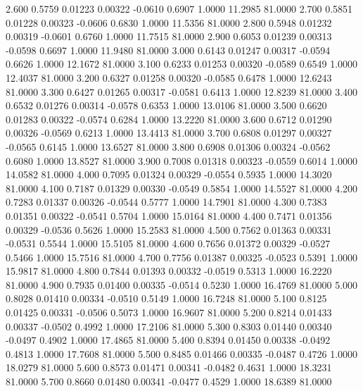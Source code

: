    2.600   0.5759   0.01223   0.00322  -0.0610   0.6907   1.0000  11.2985  81.0000
   2.700   0.5851   0.01228   0.00323  -0.0606   0.6830   1.0000  11.5356  81.0000
   2.800   0.5948   0.01232   0.00319  -0.0601   0.6760   1.0000  11.7515  81.0000
   2.900   0.6053   0.01239   0.00313  -0.0598   0.6697   1.0000  11.9480  81.0000
   3.000   0.6143   0.01247   0.00317  -0.0594   0.6626   1.0000  12.1672  81.0000
   3.100   0.6233   0.01253   0.00320  -0.0589   0.6549   1.0000  12.4037  81.0000
   3.200   0.6327   0.01258   0.00320  -0.0585   0.6478   1.0000  12.6243  81.0000
   3.300   0.6427   0.01265   0.00317  -0.0581   0.6413   1.0000  12.8239  81.0000
   3.400   0.6532   0.01276   0.00314  -0.0578   0.6353   1.0000  13.0106  81.0000
   3.500   0.6620   0.01283   0.00322  -0.0574   0.6284   1.0000  13.2220  81.0000
   3.600   0.6712   0.01290   0.00326  -0.0569   0.6213   1.0000  13.4413  81.0000
   3.700   0.6808   0.01297   0.00327  -0.0565   0.6145   1.0000  13.6527  81.0000
   3.800   0.6908   0.01306   0.00324  -0.0562   0.6080   1.0000  13.8527  81.0000
   3.900   0.7008   0.01318   0.00323  -0.0559   0.6014   1.0000  14.0582  81.0000
   4.000   0.7095   0.01324   0.00329  -0.0554   0.5935   1.0000  14.3020  81.0000
   4.100   0.7187   0.01329   0.00330  -0.0549   0.5854   1.0000  14.5527  81.0000
   4.200   0.7283   0.01337   0.00326  -0.0544   0.5777   1.0000  14.7901  81.0000
   4.300   0.7383   0.01351   0.00322  -0.0541   0.5704   1.0000  15.0164  81.0000
   4.400   0.7471   0.01356   0.00329  -0.0536   0.5626   1.0000  15.2583  81.0000
   4.500   0.7562   0.01363   0.00331  -0.0531   0.5544   1.0000  15.5105  81.0000
   4.600   0.7656   0.01372   0.00329  -0.0527   0.5466   1.0000  15.7516  81.0000
   4.700   0.7756   0.01387   0.00325  -0.0523   0.5391   1.0000  15.9817  81.0000
   4.800   0.7844   0.01393   0.00332  -0.0519   0.5313   1.0000  16.2220  81.0000
   4.900   0.7935   0.01400   0.00335  -0.0514   0.5230   1.0000  16.4769  81.0000
   5.000   0.8028   0.01410   0.00334  -0.0510   0.5149   1.0000  16.7248  81.0000
   5.100   0.8125   0.01425   0.00331  -0.0506   0.5073   1.0000  16.9607  81.0000
   5.200   0.8214   0.01433   0.00337  -0.0502   0.4992   1.0000  17.2106  81.0000
   5.300   0.8303   0.01440   0.00340  -0.0497   0.4902   1.0000  17.4865  81.0000
   5.400   0.8394   0.01450   0.00338  -0.0492   0.4813   1.0000  17.7608  81.0000
   5.500   0.8485   0.01466   0.00335  -0.0487   0.4726   1.0000  18.0279  81.0000
   5.600   0.8573   0.01471   0.00341  -0.0482   0.4631   1.0000  18.3231  81.0000
   5.700   0.8660   0.01480   0.00341  -0.0477   0.4529   1.0000  18.6389  81.0000
